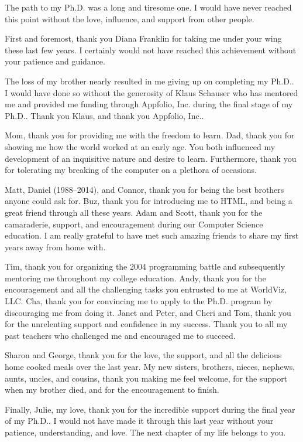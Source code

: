 \begin{acknowledgements}

The path to my Ph.D. was a long and tiresome one. I would have never reached
this point without the love, influence, and support from other people.

First and foremost, thank you Diana Franklin for taking me under your wing
these last few years. I certainly would not have reached this achievement
without your patience and guidance.

The loss of my brother nearly resulted in me giving up on completing my
Ph.D.. I would have done so without the generosity of Klaus Schauser who has
mentored me and provided me funding through Appfolio, Inc. during the final
stage of my Ph.D.. Thank you Klaus, and thank you Appfolio, Inc..

Mom, thank you for providing me with the freedom to learn. Dad, thank you for
showing me how the world worked at an early age. You both influenced my
development of an inquisitive nature and desire to learn. Furthermore, thank
you for tolerating my breaking of the computer on a plethora of occasions.

Matt, Daniel (1988--2014), and Connor, thank you for being the best brothers
anyone could ask for. Buz, thank you for introducing me to HTML, and being a
great friend through all these years. Adam and Scott, thank you for the
camaraderie, support, and encouragement during our Computer Science
education. I am really grateful to have met such amazing friends to share my
first years away from home with.

Tim, thank you for organizing the 2004 programming battle and subsequently
mentoring me throughout my college education. Andy, thank you for the
encouragement and all the challenging tasks you entrusted to me at WorldViz,
LLC. Cha, thank you for convincing me to apply to the Ph.D. program by
discouraging me from doing it. Janet and Peter, and Cheri and Tom, thank you
for the unrelenting support and confidence in my success. Thank you to all my
past teachers who challenged me and encouraged me to succeed.

Sharon and George, thank you for the love, the support, and all the delicious
home cooked meals over the last year. My new sisters, brothers, nieces,
nephews, aunts, uncles, and cousins, thank you making me feel welcome, for the
support when my brother died, and for the encouragement to finish.

Finally, Julie, my love, thank you for the incredible support during the final
year of my Ph.D.. I would not have made it through this last year without your
patience, understanding, and love. The next chapter of my life belongs to you.

\end{acknowledgements}

